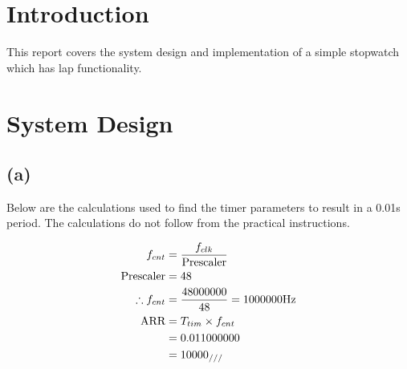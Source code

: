 \section{Introduction}
\label{sec:Introduction}
This report covers the system design and implementation of a simple stopwatch which has lap functionality.

\section*{System Design}
\label{sec:System Design}
\subsection*{(a)}
\label{sub:(a)}
  Below are the calculations used to find the timer parameters to result in a 0.01s period. The calculations do not follow from the practical instructions.

  \begin{equation}
    \begin{split}
      f_{cnt} &= \frac{f_{clk}}{\text{Prescaler}}\\
      \text{Prescaler} &= 48\\
      \therefore f_{cnt} &= \frac{48000000}{48} = 1000000 \text{Hz}\\
      \text{ARR} &= T_{tim} \times f_{cnt}\\
      &= 0.01 1000000\\
      &= 10000 _{\slash \slash \slash}
    \end{split}
  \end{equation}

\newpage
